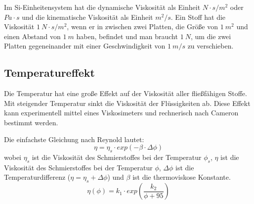 Im Si-Einheitensystem hat die dynamische Viskosität als Einheit $N \cdot s/m^2$ oder $Pa \cdot s$ und die kinematische Viskosität als Einheit $m^2/s$.
Ein Stoff hat die Viskosität $1~N \cdot s/m^2$, wenn er in zwischen zwei Platten, die Größe von $1~m^2$ und einen Abstand von $1~m$ haben, befindet und man braucht $1~N$, um die zwei Platten gegeneinander mit einer Geschwindigkeit von $1~m/s$ zu verschieben.

\subsection*{Temperatureffekt}
\label{sub:temperatureffekt}
Die Temperatur hat eine große Effekt auf der Viskosität aller fließfähigen Stoffe.
Mit steigender Temperatur sinkt die Viskosität der Flüssigkeiten ab.
Diese Effekt kann experimentell mittel eines Viskosimeters und rechnerisch nach Cameron bestimmt werden.

Die einfachste Gleichung nach Reynold lautet:
\begin{equation}
    \eta = \eta_{s} \cdot exp (-\beta \cdot \Delta\phi)
    \label{eq:dynamische_viskositaet_reynold}
\end{equation}
%
wobei $\eta_{s}$ ist die Viskosität des Schmierstoffes bei der Temperatur $\phi_{s}$, $\eta$ ist die Viskosität des Schmierstoffes bei der Temperatur $\phi$, $\Delta{\phi}$ ist die Temperaturdifferenz ($\eta = \eta_{s} + \Delta{\phi}$) und $\beta$ ist die thermoviskose Konstante.
\begin{equation}
    \eta(\phi) = k_1 \cdot exp \left( \frac{k_2}{\phi + 95} \right)
    \label{eq:dynamische_viskositaet_cameron}
\end{equation}


